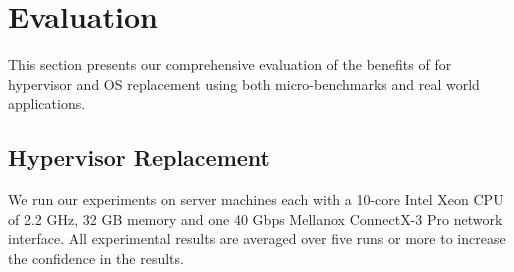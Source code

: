 \section{Evaluation}
This section presents our comprehensive evaluation of the
benefits of \arch for hypervisor and OS replacement using both micro-benchmarks and real world applications.
\subsection{Hypervisor Replacement}
We run our experiments on server machines each with a 10-core Intel Xeon CPU of 2.2 GHz, 32 GB memory and one 40 Gbps Mellanox ConnectX-3 Pro network interface. All experimental results are averaged over five runs or more to increase the confidence in the results. 





